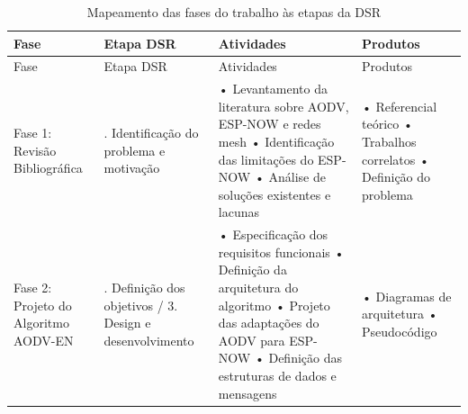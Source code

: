 {\def\LTcaptype{quadro}
\begin{longtable}[]{@{}
  >{\raggedright\arraybackslash}p{}
  >{\raggedright\arraybackslash}p{}
  >{\raggedright\arraybackslash}p{}
  >{\raggedright\arraybackslash}p{}@{}}
\caption{Mapeamento das fases do trabalho às etapas da DSR}\label{quadro:dsr-map}\\
\toprule\noalign{}
\begin{minipage}[b]{\linewidth}\raggedright
Fase
\end{minipage} & \begin{minipage}[b]{\linewidth}\raggedright
Etapa DSR
\end{minipage} & \begin{minipage}[b]{\linewidth}\raggedright
Atividades
\end{minipage} & \begin{minipage}[b]{\linewidth}\raggedright
Produtos
\end{minipage} \\
\midrule\noalign{}
\endfirsthead
\toprule\noalign{}
\begin{minipage}[b]{\linewidth}\raggedright
Fase
\end{minipage} & \begin{minipage}[b]{\linewidth}\raggedright
Etapa DSR
\end{minipage} & \begin{minipage}[b]{\linewidth}\raggedright
Atividades
\end{minipage} & \begin{minipage}[b]{\linewidth}\raggedright
Produtos
\end{minipage} \\
\midrule\noalign{}
\endhead
\bottomrule\noalign{}
\endlastfoot
Fase 1: Revisão Bibliográfica & 1. Identificação do problema e motivação
& • Levantamento da literatura sobre AODV, ESP-NOW e redes mesh •
Identificação das limitações do ESP-NOW • Análise de soluções existentes
e lacunas & • Referencial teórico • Trabalhos correlatos • Definição do
problema \\
Fase 2: Projeto do Algoritmo AODV-EN & 2. Definição dos objetivos / 3.
Design e desenvolvimento & • Especificação dos requisitos funcionais •
Definição da arquitetura do algoritmo • Projeto das adaptações do AODV
para ESP-NOW • Definição das estruturas de dados e mensagens & •
Diagramas de arquitetura • Pseudocódigo \\

\end{longtable}}
